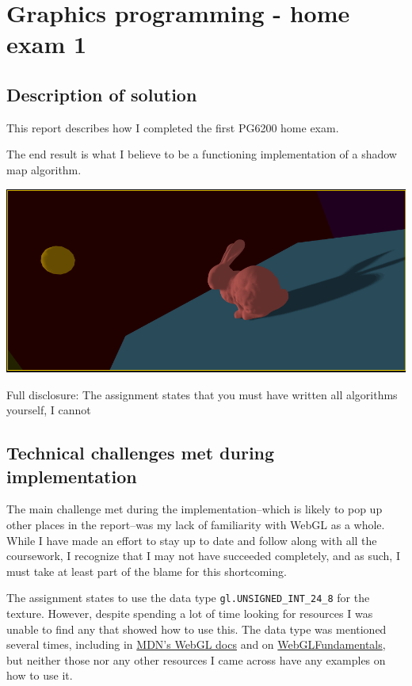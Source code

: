 \documentclass[11pt]{article}
\author{UTL28}
\date{\today}
\title{}
\begin{document}
\tableofcontents

\section{Graphics programming - home exam 1}
\label{sec:org4f102bb}
\subsection{Description of solution}
\label{sec:org0a16a86}
This report describes how I completed the first PG6200 home exam.

The end result is what I believe to be a functioning implementation of a shadow map algorithm.

\begin{center}
\includegraphics[width=.9\linewidth]{images/bunny_final.png}
\end{center}

Full disclosure:
The assignment states that you must have written all algorithms yourself, I cannot

\subsection{Technical challenges met during implementation}
\label{sec:orge846ce7}
The main challenge met during the implementation--which is likely to pop up other places in the report--was my lack of familiarity with WebGL as a whole. While I have made an effort to stay up to date and follow along with all the coursework, I recognize that I may not have succeeded completely, and as such, I must take at least part of the blame for this shortcoming.

The assignment states to use the data type \texttt{gl.UNSIGNED\_INT\_24\_8} for the texture. However, despite spending a lot of time looking for resources I was unable to find any that showed how to use this. The data type was mentioned several times, including in \href{https://developer.mozilla.org/en-US/docs/Web/API/WEBGL\_depth\_texture}{MDN's WebGL docs} and on \href{https://webgl2fundamentals.org/webgl/lessons/webgl-data-textures.html}{WebGLFundamentals}, but neither those nor any other resources I came across have any examples on how to use it.
\end{document}
